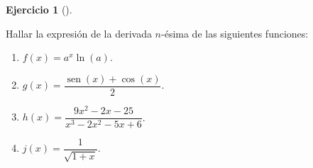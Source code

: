 \documentclass[
  a4paper,
]{scrreport}
\providecommand{\tightlist}{%
  \setlength{\itemsep}{0pt}\setlength{\parskip}{0pt}}\usepackage{longtable,booktabs,array}
\theoremstyle{definition}
\newtheorem{exercise}{Ejercicio}[chapter]
\theoremstyle{remark}
\begin{document}
\begin{exercise}[]\protect\hypertarget{exr-derivadas-orden-n}{}\label{exr-derivadas-orden-n}

Hallar la expresión de la derivada \(n\)-ésima de las siguientes
funciones:

\begin{enumerate}
\def\labelenumi{\alph{enumi}.}
\tightlist
\item
  \(f(x)=a^x\ln(a)\).
\item
  \(g(x)=\dfrac{\operatorname{sen}(x)+\cos(x)}{2}\).
\item
  \(h(x)=\dfrac{9x^2-2x-25}{x^3-2x^2-5x+6}\).
\item
  \(j(x)=\dfrac{1}{\sqrt{1+x}}\).
\end{enumerate}

\end{exercise}
\end{document}
